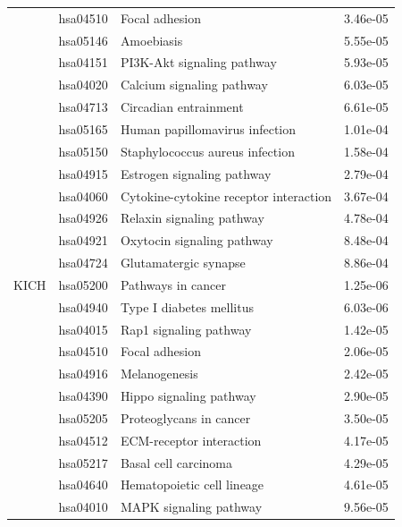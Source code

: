 \begin{longtable}{cllr}
 & hsa04510 & \textcolor{\clrnew}{Focal adhesion} & 3.46e-05 \\ 
 & hsa05146 & \textcolor{\clrnew}{Amoebiasis} & 5.55e-05 \\ 
 & hsa04151 & \textcolor{\clrnew}{PI3K-Akt signaling pathway} & 5.93e-05 \\ 
 & hsa04020 & \textcolor{\clrnew}{Calcium signaling pathway} & 6.03e-05 \\ 
 & hsa04713 & \textcolor{\clrnew}{Circadian entrainment} & 6.61e-05 \\ 
 & hsa05165 & \textcolor{\clrnew}{Human papillomavirus infection} & 1.01e-04 \\ 
 & hsa05150 & \textcolor{\clrnew}{Staphylococcus aureus infection} & 1.58e-04 \\ 
 & hsa04915 & \textcolor{\clrnew}{Estrogen signaling pathway} & 2.79e-04 \\ 
 & hsa04060 & \textcolor{\clrnew}{Cytokine-cytokine receptor interaction} & 3.67e-04 \\ 
 & hsa04926 & \textcolor{\clrnew}{Relaxin signaling pathway} & 4.78e-04 \\ 
 & hsa04921 & \textcolor{\clrnew}{Oxytocin signaling pathway} & 8.48e-04 \\ 
 & hsa04724 & \textcolor{\clrnew}{Glutamatergic synapse} & 8.86e-04 \\ 
\midrule 
KICH & hsa05200 & \textcolor{\clrnew}{Pathways in cancer} & 1.25e-06\\ 
 & hsa04940 & \textcolor{\clrnew}{Type I diabetes mellitus} & 6.03e-06 \\ 
 & hsa04015 & \textcolor{\clrnew}{Rap1 signaling pathway} & 1.42e-05 \\ 
 & hsa04510 & \textcolor{\clrnew}{Focal adhesion} & 2.06e-05 \\ 
 & hsa04916 & \textcolor{\clrnew}{Melanogenesis} & 2.42e-05 \\ 
 & hsa04390 & \textcolor{\clrnew}{Hippo signaling pathway} & 2.90e-05 \\ 
 & hsa05205 & \textcolor{\clrnew}{Proteoglycans in cancer} & 3.50e-05 \\ 
 & hsa04512 & \textcolor{\clrnew}{ECM-receptor interaction} & 4.17e-05 \\ 
 & hsa05217 & \textcolor{\clrnew}{Basal cell carcinoma} & 4.29e-05 \\ 
 & hsa04640 & \textcolor{\clrnew}{Hematopoietic cell lineage} & 4.61e-05 \\ 
 & hsa04010 & \textcolor{\clrnew}{MAPK signaling pathway} & 9.56e-05 \\ 

\end{longtable}
